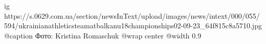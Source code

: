  
 
 
 
 

\ifcmt
  ig https://s.0629.com.ua/section/newsInText/upload/images/news/intext/000/055/594/ukrainianathleticsteamatbalkanu18championships02-09-23_64f815c8a5710.jpg
	@caption Фото: Kristina Romaschuk
  @wrap center
  @width 0.9
\fi
